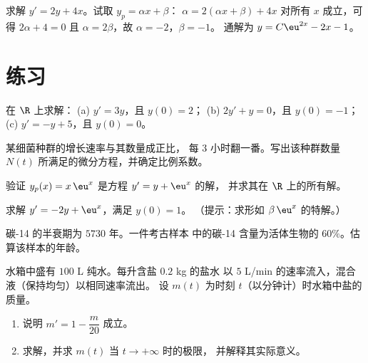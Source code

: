 \begin{example}\label{ex:g12:diffeq:particular}
求解 $y' = 2y + 4x$。试取 $y_p = \alpha x + \beta$：
$\alpha = 2(\alpha x + \beta) + 4x$ 对所有 $x$ 成立，可得
$2\alpha + 4 = 0$ 且 $\alpha = 2\beta$，故 $\alpha = -2$，$\beta = -1$。
通解为 $y = C\eu^{2x} - 2x - 1$。
\end{example}

\section{练习}

\begin{exercise}[$\star$]\label{exo:g12:diffeq:1}
在 $\R$ 上求解：
(a) $y' = 3y$，且 $y(0) = 2$；\quad
(b) $2y' + y = 0$，且 $y(0) = -1$；\quad
(c) $y' = -y + 5$，且 $y(0) = 0$。
\end{exercise}

\begin{exercise}[$\star$]\label{exo:g12:diffeq:2}
某细菌种群的增长速率与其数量成正比，
每 $3$ 小时翻一番。写出该种群数量
$N(t)$ 所满足的微分方程，并确定比例系数。
\end{exercise}

\begin{exercise}[$\star$]\label{exo:g12:diffeq:3}
验证 $y_p(x) = x\,\eu^{x}$ 是方程 $y' = y + \eu^x$ 的解，
并求其在 $\R$ 上的所有解。
\end{exercise}

\begin{exercise}[$\star\star$]\label{exo:g12:diffeq:4}
求解 $y' = -2y + \eu^{x}$，满足 $y(0) = 1$。
（提示：求形如 $\beta\,\eu^{x}$ 的特解。）
\end{exercise}

\begin{exercise}[$\star\star$]\label{exo:g12:diffeq:5}
碳-14 的半衰期为 $5730$ 年。一件考古样本
中的碳-14 含量为活体生物的 $60\%$。估算该样本的年龄。
\end{exercise}

\begin{exercise}[$\star\star$]\label{exo:g12:diffeq:6}
水箱中盛有 $100$ L 纯水。每升含盐 $0.2$ kg 的盐水
以 $5$ L/min 的速率流入，混合液（保持均匀）以相同速率流出。
设 $m(t)$ 为时刻 $t$（以分钟计）时水箱中盐的质量。
\begin{enumerate}
  \item 说明 $m' = 1 - \dfrac{m}{20}$ 成立。
  \item 求解，并求 $m(t)$ 当 $t \to +\infty$ 时的极限，
        并解释其实际意义。
\end{enumerate}
\end{exercise}

